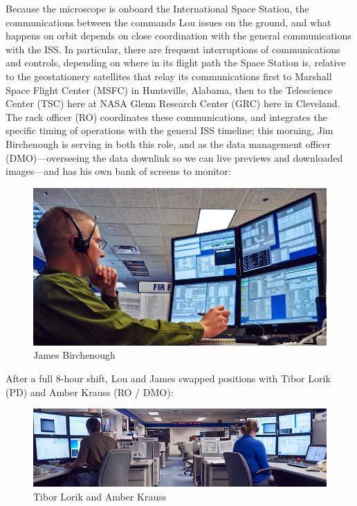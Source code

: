 Because the microscope is onboard the International Space Station, the communications between the commands Lou issues on the ground, and what happens on orbit depends on close coordination with the general communications with the ISS. In particular, there are frequent interruptions of communications and controls, depending on where in its flight path the Space Station is, relative to the geostationery satellites that relay its communications first to Marshall Space Flight Center (MSFC) in Huntsville, Alabama, then to the Telescience Center (TSC) here at NASA Glenn Research Center (GRC) here in Cleveland. The rack officer (RO) coordinates these communications, and integrates the specific timing of operations with the general ISS timeline; this morning, Jim Birchenough is serving in both this role, and as the data management officer (DMO)---overseeing the data downlink so we can live previews and downloaded images---and has his own bank of screens to monitor:
\begin{figure}[h]
\begin{center}
\includegraphics[width=\columnwidth]{./images/2014_06_04_first_day/140604_ace_tsc_birchenough_james_web.jpg}
\end{center}
\caption{James Birchenough}
\end{figure}

After a full 8-hour shift, Lou and James swapped positions with Tibor Lorik (PD) and Amber Krauss (RO / DMO):
\begin{figure}[h]
\begin{center}
\includegraphics[width=\columnwidth]{./images/2014_06_04_first_day/140604_ace_tsc_tibor_amber_web.jpg}
\end{center}
\caption{Tibor Lorik and Amber Krauss}

\end{figure}

